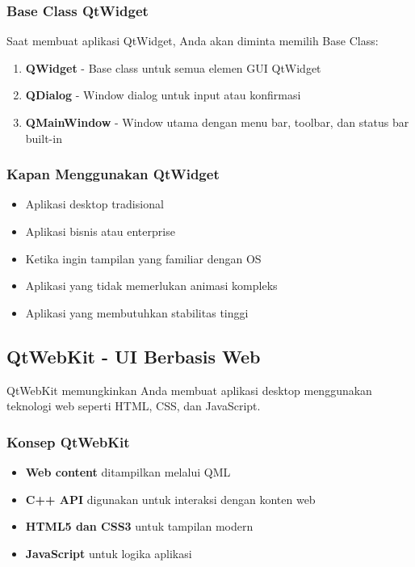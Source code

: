 \subsubsection{Base Class QtWidget}

Saat membuat aplikasi QtWidget, Anda akan diminta memilih Base Class:

\begin{enumerate}
\item \textbf{QWidget} - Base class untuk semua elemen GUI QtWidget
\item \textbf{QDialog} - Window dialog untuk input atau konfirmasi
\item \textbf{QMainWindow} - Window utama dengan menu bar, toolbar, dan status bar built-in
\end{enumerate}

\subsubsection{Kapan Menggunakan QtWidget}

\begin{itemize}
\item Aplikasi desktop tradisional
\item Aplikasi bisnis atau enterprise
\item Ketika ingin tampilan yang familiar dengan OS
\item Aplikasi yang tidak memerlukan animasi kompleks
\item Aplikasi yang membutuhkan stabilitas tinggi
\end{itemize}

\subsection{QtWebKit - UI Berbasis Web}

QtWebKit memungkinkan Anda membuat aplikasi desktop menggunakan teknologi web seperti HTML, CSS, dan JavaScript.

\subsubsection{Konsep QtWebKit}

\begin{itemize}
\item \textbf{Web content} ditampilkan melalui QML
\item \textbf{C++ API} digunakan untuk interaksi dengan konten web
\item \textbf{HTML5 dan CSS3} untuk tampilan modern
\item \textbf{JavaScript} untuk logika aplikasi
\end{itemize}

